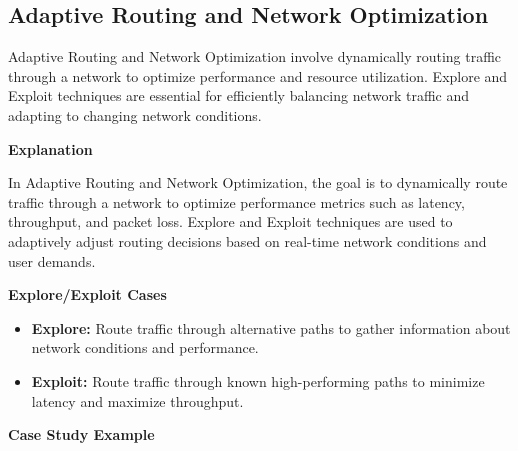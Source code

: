 \documentclass[12pt]{book} %
\begin{document}
\subsection{Adaptive Routing and Network Optimization}

Adaptive Routing and Network Optimization involve dynamically routing traffic through a network to optimize performance and resource utilization. Explore and Exploit techniques are essential for efficiently balancing network traffic and adapting to changing network conditions.

\textbf{Explanation}

In Adaptive Routing and Network Optimization, the goal is to dynamically route traffic through a network to optimize performance metrics such as latency, throughput, and packet loss. Explore and Exploit techniques are used to adaptively adjust routing decisions based on real-time network conditions and user demands.

\textbf{Explore/Exploit Cases}

\begin{itemize}
    \item \textbf{Explore:} Route traffic through alternative paths to gather information about network conditions and performance.
    \item \textbf{Exploit:} Route traffic through known high-performing paths to minimize latency and maximize throughput.
\end{itemize}

\textbf{Case Study Example}
\end{document}
